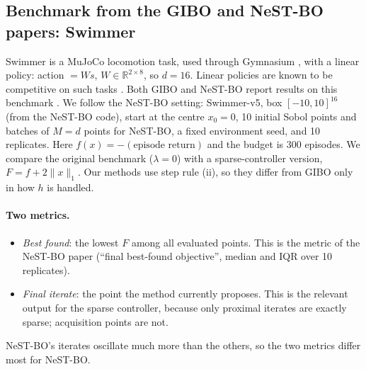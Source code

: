 \documentclass[10pt]{article}
\newcommand{\R}{\mathbb{R}}
\theoremstyle{remark}
\begin{document}
\subsection{Benchmark from the GIBO and NeST-BO papers: Swimmer}\label{sec:exp-swimmer}
Swimmer is a MuJoCo \citep{todorov2012mujoco} locomotion task, used through Gymnasium \citep{towers2024gymnasium}, with a linear policy:
action $=Ws$, $W\in\R^{2\times8}$, so $d=16$. Linear policies are known to be competitive on such tasks \citep{mania2018ars}. Both GIBO and NeST-BO
report results on this benchmark \citep{muller2021gibo,tang2026nestbo}. We follow the NeST-BO setting: Swimmer-v5, box $[-10,10]^{16}$ (from the
NeST-BO code), start at the centre $x_0=0$, 10 initial Sobol points and batches of $M=d$ points for NeST-BO, a fixed environment seed, and
10 replicates. Here $f(x)=-(\text{episode return})$ and the budget is 300 episodes. We compare the original benchmark ($\lambda=0$) with a
sparse-controller version, $F=f+2\|x\|_1$. Our methods use step rule (ii), so they differ from GIBO only in how $h$ is handled.

\paragraph{Two metrics.}
\begin{itemize}
\item \emph{Best found}: the lowest $F$ among all evaluated points. This is the metric of the NeST-BO paper (``final best-found objective'',
median and IQR over 10 replicates).
\item \emph{Final iterate}: the point the method currently proposes. This is the relevant output for the sparse controller, because only
proximal iterates are exactly sparse; acquisition points are not.
\end{itemize}
NeST-BO's iterates oscillate much more than the others, so the two metrics differ most for NeST-BO.
\end{document}
